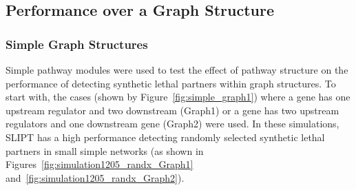 \FloatBarrier

\subsection{Performance over a Graph Structure}
\label{chap5:graphsim_performance}

\subsubsection{Simple Graph Structures}
\label{chap5:graphsim_performance_simple}

\FloatBarrier

Simple pathway modules were used to test the effect of pathway structure on the performance of detecting synthetic lethal partners within graph structures. To start with, the cases (shown by Figure~\ref{fig:simple_graph1}) where a gene has one upstream regulator and two downstream (Graph1) or a gene has two upstream regulators and one downstream gene (Graph2) were used. In these simulations, \gls{SLIPT} has a high performance detecting randomly selected synthetic lethal partners in small simple networks (as shown in Figures~\ref{fig:simulation1205_randx_Graph1} and~\ref{fig:simulation1205_randx_Graph2}). 

